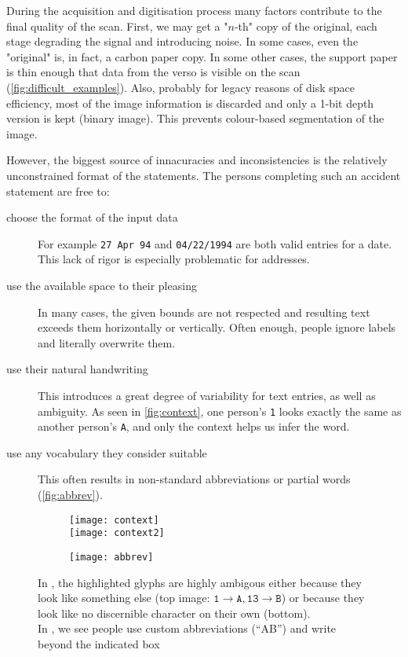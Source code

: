 	During the acquisition and digitisation process many factors contribute to the final quality of the scan. First, we may get a "$n$-th" copy of the original, each stage degrading the signal and introducing noise. In some cases, even the "original" is, in fact, a carbon paper copy. In some other cases, the support paper is thin enough that data from the verso is visible on the scan (\autoref{fig:difficult_examples}). Also, probably for legacy reasons of disk space efficiency, most of the image information is discarded and only a 1-bit depth version is kept (binary image). This prevents colour-based segmentation of the image.

	However, the biggest source of innacuracies and inconsistencies is the relatively unconstrained format of the statements. The persons completing such an accident statement are free to:
	\begin{description}
		\item[choose the format of the input data] For example \texttt{27 Apr 94} and \texttt{04/22/1994} are both valid entries for a date. This lack of rigor is especially problematic for addresses.

		\item[use the available space to their pleasing] In many cases, the given bounds are not respected and resulting text exceeds them horizontally or vertically. Often enough, people ignore labels and literally overwrite them.

		\item[use their natural handwriting] \label{itm:natural_handwriting} This introduces a great degree of variability for text entries, as well as ambiguity. As seen in \autoref{fig:context}, one person's \texttt{1} looks exactly the same as another person's \texttt{A}, and only the context helps us infer the word.

		\item[use any vocabulary they consider suitable] This often results in non-standard abbreviations or partial words (\autoref{fig:abbrev}).
	\end{description}

	\begin{figure}
		\begin{subfigure}[b]{.5\linewidth}
			\centering
			\texttt{[image: context]}\\
			\texttt{[image: context2]}
			\caption{}\label{fig:context}
		\end{subfigure}
		\begin{subfigure}[b]{.48\linewidth}
			\texttt{[image: abbrev]}
			\caption{}\label{fig:abbrev}
		\end{subfigure}
		\caption[Ambiguity in handwriting]{In , the highlighted glyphs are highly ambigous either because they look like something else (top image: \(\mathtt{1} \rightarrow \mathtt{A}, \mathtt{13} \rightarrow \mathtt{B} \)) or because they look like no discernible character on their own (bottom).\\
		In , we see people use custom abbreviations (``AB'') and write beyond the indicated box}
	\end{figure}


